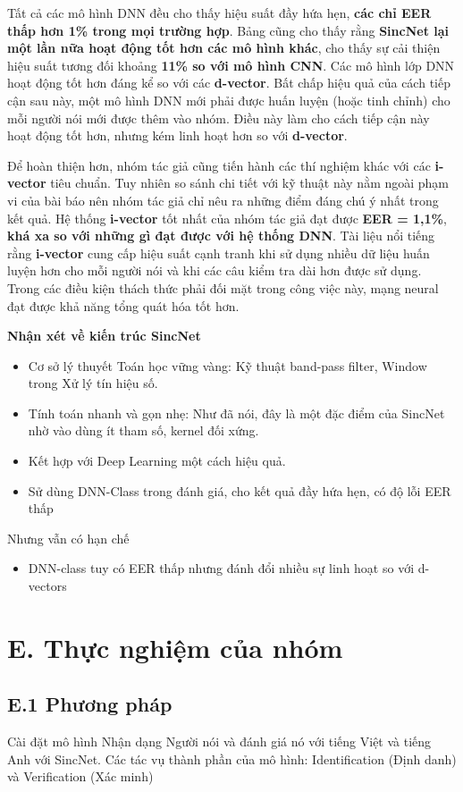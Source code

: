 \documentclass{article}
\begin{document}
	Tất cả các mô hình DNN đều cho thấy hiệu suất đầy hứa hẹn, \textbf{các chỉ EER thấp hơn 1\% trong mọi trường hợp}. Bảng cũng cho thấy rằng \textbf{SincNet lại một lần nữa hoạt động tốt hơn các mô hình khác}, cho thấy sự cải thiện hiệu suất tương đối khoảng \textbf{11\% so với mô hình CNN}. Các mô hình lớp DNN hoạt động tốt hơn đáng kể so với các \textbf{d-vector}. Bất chấp hiệu quả của cách tiếp cận sau này, một mô hình DNN mới phải được huấn luyện (hoặc tinh chỉnh) cho mỗi người nói mới được thêm vào nhóm. Điều này làm cho cách tiếp cận này hoạt động tốt hơn, nhưng kém linh hoạt hơn so với \textbf{d-vector}.
	
	Để hoàn thiện hơn, nhóm tác giả cũng tiến hành các thí nghiệm khác với các \textbf{i-vector} tiêu chuẩn. Tuy nhiên so sánh chi tiết với kỹ thuật này nằm ngoài phạm vi của bài báo nên nhóm tác giả chỉ nêu ra những điểm đáng chú ý nhất trong kết quả. Hệ thống \textbf{i-vector} tốt nhất của nhóm tác giả đạt được \textbf{EER = 1,1\%}, \textbf{khá xa so với những gì đạt được với hệ thống DNN}. Tài liệu nổi tiếng rằng \textbf{i-vector} cung cấp hiệu suất cạnh tranh khi sử dụng nhiều dữ liệu huấn luyện hơn cho mỗi người nói và khi các câu kiểm tra dài hơn được sử dụng. Trong các điều kiện thách thức phải đối mặt trong công việc này, mạng neural đạt được khả năng tổng quát hóa tốt hơn.
	
	\textbf{Nhận xét về kiến trúc SincNet}
	\begin{itemize}
		\item Cơ sở lý thuyết Toán học vững vàng: Kỹ thuật band-pass filter, Window trong Xử lý tín hiệu số.
		\item Tính toán nhanh và gọn nhẹ: Như đã nói, đây là một đặc điểm của SincNet nhờ vào dùng ít tham số, kernel đối xứng.
		\item Kết hợp với Deep Learning một cách hiệu quả.
		\item Sử dùng DNN-Class trong đánh giá, cho kết quả đầy hứa hẹn, có độ lỗi EER thấp
	\end{itemize}
	Nhưng vẫn có hạn chế
	\begin{itemize}
		\item DNN-class tuy có EER thấp nhưng đánh đổi nhiều sự linh hoạt so với d-vectors
	\end{itemize}


	\section{E. Thực nghiệm của nhóm}
	\subsection{E.1 Phương pháp}
	Cài đặt mô hình Nhận dạng Người nói và đánh giá nó với tiếng Việt và tiếng Anh với SincNet.
	Các tác vụ thành phần của mô hình: Identification (Định danh) và Verification (Xác minh)
	
\end{document}

